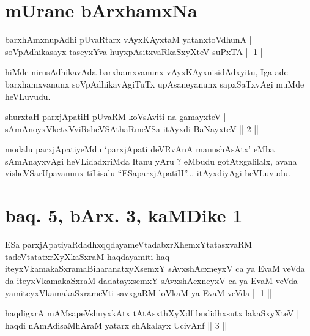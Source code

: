 
\section*{mUrane bArxhamxNa}

 \begin{shl}
barxhAmxnupAdhi pUvaRtarx vAyxKAyxtaM yatanxtoV\s dhunA | \\
soVpAdhikasayx taseyxYva huyxpAsitxvaRkaSxyXteV suPxTA \hfill ||  1 || 
\end{shl}

\begin{artha}
hiMde nirusAdhikavAda barxhamxvanunx vAyxKAyxnisidAdxyitu, Iga ade barxhamxvanunx soVpAdhikavAgiTuTx upAsaneyanunx sapxSaTxvAgi muMde heVLuvudu.
\end{artha}

\begin{shl}
shurxtaH parxjApatiH pUvaRM koV\s sAviti na gamayxteV | \\
sAmAnoyxVketxVviRsheVSAthaRmeVSa itAyxdi BaNayxteV \hfill ||  2 || 
\end{shl}	

\begin{artha}
modalu parxjApatiyeMdu `parxjApati deVRvAnA manushAsAtx' eMba sAmAnayxvAgi heVLidadxriMda Itanu yAru ? eMbudu gotAtxgalilalx, avana visheVSarUpavanunx tiLisalu ``ESaparxjApatiH''... itAyxdiyAgi heVLuvudu.
\end{artha}

\section*{baq. 5, bArx. 3, kaMDike 1}

\begin{shl}
ESa parxjApatiyaRdadhxqqdayameVtadabxrXhemxYtatasxvaRM tadeVtatatxrXyXkaSxraM haqdayamiti haq iteyxVkamakaSxramaBiharanatxyXsemxY sAvxshAcxneyxV ca ya EvaM veVda da iteyxVkamakaSxraM dadatayxsemxY sAvxshAcxneyxV ca ya EvaM veVda yamiteyxVkamakaSxrameVti savxgaRM loVkaM ya EvaM veVda || 1 ||
\end{shl}


\begin{shl}
haqdigxrA mAMsapeVshuyxkAtx tAtAsxthXyXdf budidhxsutx lakaSxyXteV | \\
haqdi nAmAdisaMhAraM yatarx shAkalayx UcivAnf \hfill ||  3 || 
\end{shl}

